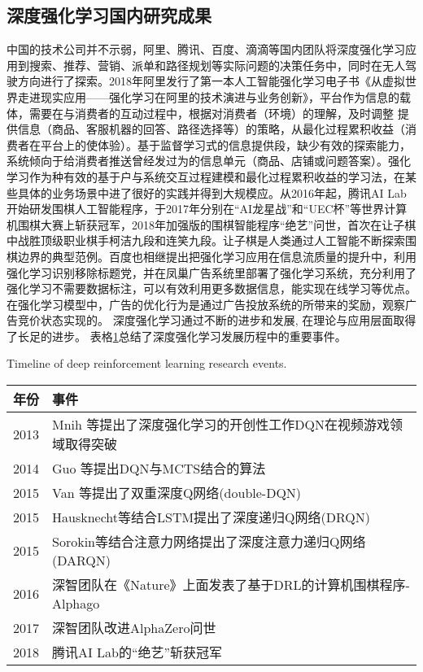 \subsection{深度强化学习国内研究成果}
中国的技术公司并不示弱，阿里、腾讯、百度、滴滴等国内团队将深度强化学习应用到搜索、推荐、营销、派单和路径规划等实际问题的决策任务中，同时在无人驾驶方向进行了探索。2018年阿里发行了第一本人工智能强化学习电子书《从虚拟世界走进现实应用——强化学习在阿里的技术演进与业务创新》，平台作为信息的载体，需要在与消费者的互动过程中，根据对消费者（环境）的理解，及时调整 提供信息（商品、客服机器的回答、路径选择等）的策略，从最化过程累积收益（消费者在平台上的使体验）。基于监督学习式的信息提供段，缺少有效的探索能力，系统倾向于给消费者推送曾经发过为的信息单元（商品、店铺或问题答案）。强化学习作为种有效的基于户与系统交互过程建模和最化过程累积收益的学习法，在某些具体的业务场景中进了很好的实践并得到大规模应。从2016年起，腾讯AI Lab开始研发围棋人工智能程序，于2017年分别在“AI龙星战”和“UEC杯”等世界计算机围棋大赛上斩获冠军，2018年加强版的围棋智能程序“绝艺”问世，首次在让子棋中战胜顶级职业棋手柯洁九段和连笑九段。让子棋是人类通过人工智能不断探索围棋边界的典型范例。百度也相继提出把强化学习应用在信息流质量的提升中，利用强化学习识别移除标题党，并在凤巢广告系统里部署了强化学习系统，充分利用了强化学习不需要数据标注，可以有效利用更多数据信息，能实现在线学习等优点。在强化学习模型中，广告的优化行为是通过广告投放系统的所带来的奖励，观察广告竞价状态实现的。
深度强化学习通过不断的进步和发展, 在理论与应用层面取得了长足的进步。 表格\ref{tab:1}总结了深度强化学习发展历程中的重要事件。
\begin{table}[htpb]
	\centering
	{Timeline of deep reinforcement learning research events.}
	\label{tab:1}
	\begin{tabular}{ll}
		年份 & 事件 \\ \midrule
		2013 & Mnih 等提出了深度强化学习的开创性工作DQN在视频游戏领域取得突破 \\
		2014& Guo 等提出DQN与MCTS结合的算法 \\
		2015 &Van 等提出了双重深度Q网络(double-DQN) \\
		2015&Hausknecht等结合LSTM提出了深度递归Q网络(DRQN)\\
		2015&Sorokin等结合注意力网络提出了深度注意力递归Q网络(DARQN)\\
		2016&深智团队在《Nature》上面发表了基于DRL的计算机围棋程序-Alphago\\
		2017&深智团队改进AlphaZero问世\\
		2018&腾讯AI Lab的“绝艺”斩获冠军\\
		 \bottomrule
	\end{tabular}
\end{table}
